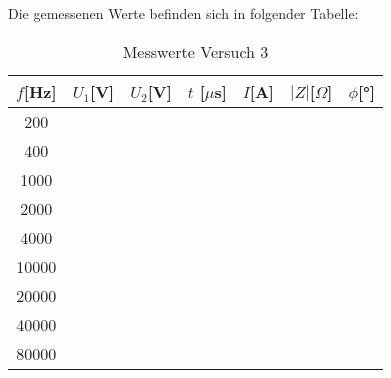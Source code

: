     Die gemessenen Werte befinden sich in folgender Tabelle:
    \begin{table}[H]
        \centering
        \caption{Messwerte Versuch 3}
        \vspace{0.5em}
        \begin{tabular}{|c||c|c|c|c|c|c|}
            \hline
            $f$[Hz] & $U_1$[V]  & $U_2$[V] & $t$ [$\mu$s] & $I$[A] & $|Z|$[$\Omega$] & $\phi$[°] \\
            \hline
            200 & & &  & & &  \\
            \hline
            400 & & &  & & &  \\
            \hline
            1000 & & &  & & &  \\
            \hline
            2000 & & &  & & &  \\
            \hline
            4000 & & &  & & &  \\
            \hline
            10000 & & &  & & &  \\
            \hline
            20000 & & &  & & & \\
            \hline
            40000 & & &  & & &  \\
            \hline
            80000 & & &  & & &  \\
            \hline
        \end{tabular}
        \label{tab:Versuch3_Messwerte}
\end{table}
